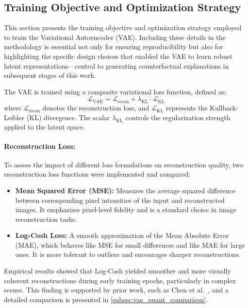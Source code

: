 \subsection{Training Objective and Optimization Strategy} \label{subsec:vae_loss}

This section presents the training objective and optimization strategy employed to train the Variational Autoencoder (VAE). Including these details in the methodology is essential not only for ensuring reproducibility but also for highlighting the specific design choices that enabled the VAE to learn robust latent representations—central to generating counterfactual explanations in subsequent stages of this work.

The VAE is trained using a composite variational loss function, defined as:
\[
\mathcal{L}_{\text{VAE}} = \mathcal{L}_{\text{recon}} + \lambda_{\text{KL}} \cdot \mathcal{L}_{\text{KL}}
\]
where $\mathcal{L}_{\text{recon}}$ denotes the reconstruction loss, and $\mathcal{L}_{\text{KL}}$ represents the Kullback-Leibler (KL) divergence. The scalar $\lambda_{\text{KL}}$ controls the regularization strength applied to the latent space.

\paragraph{Reconstruction Loss:} \label{reconstruction_loss}

To assess the impact of different loss formulations on reconstruction quality, two reconstruction loss functions were implemented and compared:
\begin{itemize}
    \item \textbf{Mean Squared Error (MSE):} Measures the average squared difference between corresponding pixel intensities of the input and reconstructed images. It emphasizes pixel-level fidelity and is a standard choice in image reconstruction tasks.
    \item \textbf{Log-Cosh Loss:} A smooth approximation of the Mean Absolute Error (MAE), which behaves like MSE for small differences and like MAE for large ones. It is more tolerant to outliers and encourages sharper reconstructions.
\end{itemize}

Empirical results showed that Log-Cosh yielded smoother and more visually coherent reconstructions during early training epochs, particularly in complex scenes. This finding is supported by prior work, such as Chen et al.~\cite{chen2019log}, and a detailed comparison is presented in \cref{subsec:vae_quant_comparison}.

